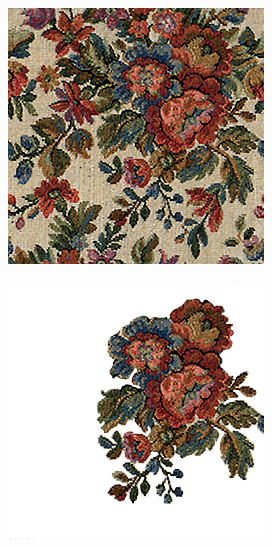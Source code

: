 \begin{figure}[]
\begin{subfigure}{\textwidth}
        \begin{subfigure}{0.24\textwidth}
            \centering
            \includegraphics[width=\textwidth]{images/04-experiment01/flowers/target.jpg}
        \end{subfigure}
        \hfill
        \begin{subfigure}{0.24\textwidth}
            \centering
            \includegraphics[width=\textwidth]{images/04-experiment01/flowers/some_bg.jpg}

\end{subfigure}
\end{subfigure}
\end{figure}
